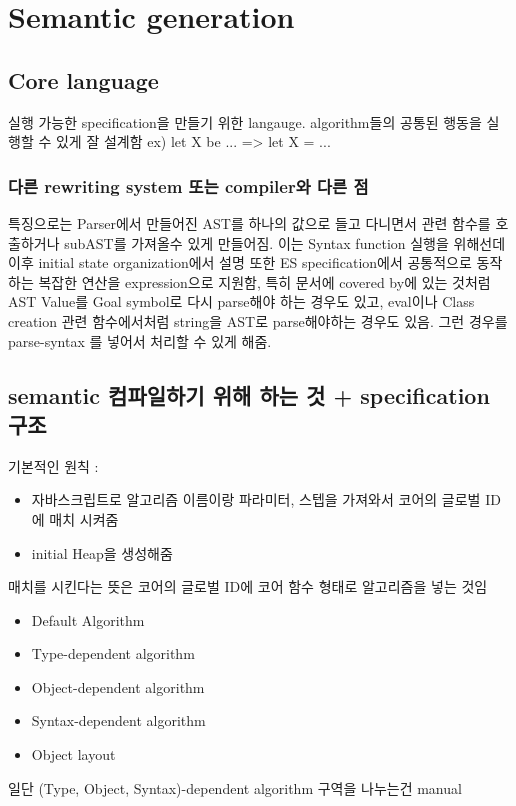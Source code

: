 \section{Semantic generation}

\subsection{Core language}
실행 가능한 specification을 만들기 위한 langauge.
algorithm들의 공통된 행동을 실행할 수 있게 잘 설계함
ex) let X be ... => let X = ...

\subsubsection{다른 rewriting system 또는 compiler와 다른 점}
특징으로는 Parser에서 만들어진 AST를 하나의 값으로 들고 다니면서 관련 함수를 호출하거나 subAST를 가져올수 있게 만들어짐. 이는 Syntax function 실행을 위해선데 이후 initial state organization에서 설명 
또한 ES specification에서 공통적으로 동작하는 복잡한 연산을 expression으로 지원함, 특히 문서에 covered by에 있는 것처럼 AST Value를 Goal symbol로 다시 parse해야 하는 경우도 있고, eval이나 Class creation 관련 함수에서처럼 string을 AST로 parse해야하는 경우도 있음. 그런 경우를 parse-syntax 를 넣어서 처리할 수 있게
해줌.

\subsection{semantic 컴파일하기 위해 하는 것 + specification 구조}
기본적인 원칙 :
\begin{itemize} 
\item 자바스크립트로 알고리즘 이름이랑 파라미터, 스텝을 가져와서 코어의 글로벌 ID에 매치 시켜줌
\item initial Heap을 생성해줌
\end{itemize}
매치를 시킨다는 뜻은 코어의 글로벌 ID에 코어 함수 형태로 알고리즘을 넣는 것임

\begin{itemize}
\item Default Algorithm
\item Type-dependent algorithm
\item Object-dependent algorithm
\item Syntax-dependent algorithm
\item Object layout
\end{itemize}

일단 (Type, Object, Syntax)-dependent algorithm 구역을 나누는건 manual

